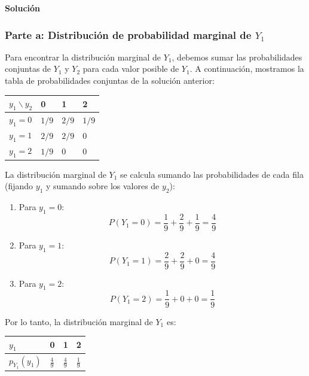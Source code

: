 \documentclass[
]{article}
\begin{document}
\textbf{Solución}

\subsubsection{\texorpdfstring{Parte a: Distribución de probabilidad marginal de \(Y_1\)}{Parte a: Distribución de probabilidad marginal de Y\_1}}\label{parte-a-distribuciuxf3n-de-probabilidad-marginal-de-y_1}

Para encontrar la distribución marginal de \(Y_1\), debemos sumar las probabilidades conjuntas de \(Y_1\) y \(Y_2\) para cada valor posible de \(Y_1\). A continuación, mostramos la tabla de probabilidades conjuntas de la solución anterior:

\begin{longtable}[]{@{}llll@{}}
\toprule\noalign{}
\(y_1 \backslash y_2\) & 0 & 1 & 2 \\
\midrule\noalign{}
\endhead
\bottomrule\noalign{}
\endlastfoot
\(y_1 = 0\) & \(1/9\) & \(2/9\) & \(1/9\) \\
\(y_1 = 1\) & \(2/9\) & \(2/9\) & \(0\) \\
\(y_1 = 2\) & \(1/9\) & \(0\) & \(0\) \\
\end{longtable}

La distribución marginal de \(Y_1\) se calcula sumando las probabilidades de cada fila (fijando \(y_1\) y sumando sobre los valores de \(y_2\)):

\begin{enumerate}
\def\labelenumi{\arabic{enumi}.}
\item
  Para \(y_1 = 0\):
  \[
  P(Y_1 = 0) = \frac{1}{9} + \frac{2}{9} + \frac{1}{9} = \frac{4}{9}
  \]
\item
  Para \(y_1 = 1\):
  \[
  P(Y_1 = 1) = \frac{2}{9} + \frac{2}{9} + 0 = \frac{4}{9}
  \]
\item
  Para \(y_1 = 2\):
  \[
  P(Y_1 = 2) = \frac{1}{9} + 0 + 0 = \frac{1}{9}
  \]
\end{enumerate}

Por lo tanto, la distribución marginal de \(Y_1\) es:

\begin{longtable}[]{@{}llll@{}}
\toprule\noalign{}
\(y_1\) & 0 & 1 & 2 \\
\midrule\noalign{}
\endhead
\bottomrule\noalign{}
\endlastfoot
\(p_{Y_1}(y_1)\) & \(\frac{4}{9}\) & \(\frac{4}{9}\) & \(\frac{1}{9}\) \\
\end{longtable}
\end{document}
